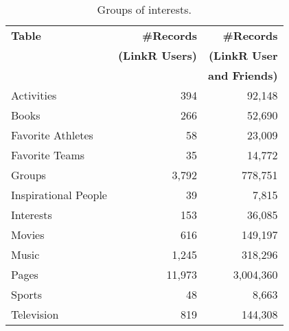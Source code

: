 \begin{table}[p]
\centering
\caption{\small Groups of interests.}
\label{tab:interests}
\begin{tabular}{|>{\small}p{2cm}|>{\small}r|>{\small}r|}
\hline
\textbf{Table} & \textbf{\#Records} & \textbf{\#Records} \\
& \textbf{(LinkR Users)} & \textbf{(LinkR User} \\
& & \textbf{and Friends)} \\
\hline
Activities & 394 & 92,148 \\
\hline
Books & 266 & 52,690 \\
\hline
Favorite Athletes & 58 & 23,009 \\
\hline
Favorite Teams & 35 & 14,772 \\
\hline
Groups & 3,792 & 778,751 \\
\hline
Inspirational People & 39 & 7,815 \\
\hline
Interests & 153 & 36,085 \\
\hline
Movies & 616 & 149,197 \\
\hline
Music & 1,245 & 318,296 \\
\hline
Pages & 11,973 & 3,004,360 \\
\hline
Sports & 48 & 8,663 \\
\hline
Television & 819 & 144,308 \\
\hline
\end{tabular}
\end{table}





